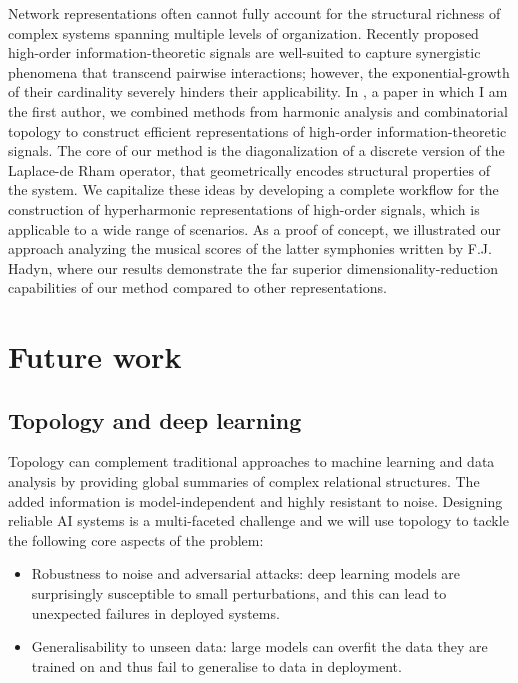 Network representations often cannot fully account for the structural richness of complex systems spanning multiple levels of organization.
Recently proposed high-order information-theoretic signals are well-suited to capture synergistic phenomena that transcend pairwise interactions; however, the exponential-growth of their cardinality severely hinders their applicability.
In \cite{medina2021hyperharmonic}, a paper in which I am the first author, we combined methods from harmonic analysis and combinatorial topology to construct efficient representations of high-order information-theoretic signals.
The core of our method is the diagonalization of a discrete version of the Laplace-de Rham operator, that geometrically encodes structural properties of the system.
We capitalize these ideas by developing a complete workflow for the construction of hyperharmonic representations of high-order signals, which is applicable to a wide range of scenarios.
As a proof of concept, we illustrated our approach  analyzing the musical scores of the latter symphonies written by F.J. Hadyn, where our results demonstrate the far superior dimensionality-reduction capabilities of our method compared to other representations.

\section{Future work}

\subsection{Topology and deep learning} Topology can complement traditional approaches to machine learning and data analysis by providing global summaries of complex relational structures.
The added information is model-independent and highly resistant to noise.
Designing reliable AI systems is a multi-faceted challenge and we will use topology to tackle the following core aspects of the problem:

\begin{itemize}
	\item Robustness to noise and adversarial attacks: deep learning models are surprisingly susceptible to small perturbations, and this can lead to unexpected failures in deployed systems.

	\item Generalisability to unseen data: large models can overfit the data they are trained on and thus fail to generalise to data in deployment.
\end{itemize}

